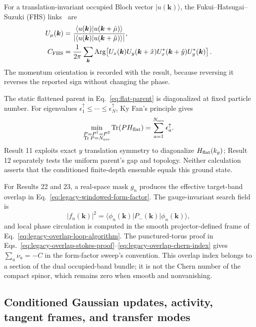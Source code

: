 \documentclass[aps,prb,twocolumn,floatfix,nofootinbib,superscriptaddress]{revtex4-2}
\newcommand{\Tr}{\operatorname{Tr}}
\begin{document}
For a translation-invariant occupied Bloch vector $|u(\boldsymbol k)\rangle$, the
Fukui--Hatsugai--Suzuki (FHS) links~\cite{FukuiHatsugaiSuzuki2005} are
\begin{align}
 U_\mu(\boldsymbol k)
 &=\frac{\langle u(\boldsymbol k)|u(\boldsymbol k+\hat\mu)\rangle}
 {|\langle u(\boldsymbol k)|u(\boldsymbol k+\hat\mu)\rangle|},\nonumber\\
 C_{\rm FHS}
 &=\frac{1}{2\pi}\sum_{\boldsymbol k}\operatorname{Arg}\!\left[
 U_x(\boldsymbol k)U_y(\boldsymbol k+\hat x)
 U_x^*(\boldsymbol k+\hat y)U_y^*(\boldsymbol k)\right].
 \label{eq:atlas-fhs}
\end{align}
The momentum orientation is recorded with the result, because reversing it reverses the
reported sign without changing the phase.

The static flattened parent in Eq.~\eqref{eq:flat-parent} is diagonalized at fixed
particle number.  For eigenvalues
$\epsilon_1^\uparrow\leq\cdots\leq\epsilon_N^\uparrow$, Ky Fan's principle gives
\begin{equation}
 \min_{\substack{P=P^\dagger=P^2\\\Tr P=N_{\rm occ}}}\Tr(PH_{\rm flat})
 =\sum_{a=1}^{N_{\rm occ}}\epsilon_a^\uparrow .
 \label{eq:atlas-ky-fan}
\end{equation}
Result 11 exploits exact $y$ translation symmetry to diagonalize
$H_{\rm flat}(k_y)$; Result 12 separately tests the uniform parent's gap and topology.
Neither calculation asserts that the conditioned finite-depth ensemble equals this
ground state.

For Results 22 and 23, a real-space mask $g_n$ produces the effective target-band overlap
in Eq.~\eqref{eq:legacy-windowed-form-factor}.  The gauge-invariant search field is
\begin{equation}
 |f_n(\boldsymbol k)|^2=
 \langle\phi_n(\boldsymbol k)|P_-(\boldsymbol k)|\phi_n(\boldsymbol k)\rangle ,
 \label{eq:atlas-overlap-magnitude}
\end{equation}
and local phase circulation is computed in the smooth projector-defined frame of
Eq.~\eqref{eq:legacy-overlap-loop-algorithm}.  The punctured-torus proof in
Eqs.~\eqref{eq:legacy-overlap-stokes-proof}--\eqref{eq:legacy-overlap-chern-index} gives
$\sum_a\nu_a=-C$ in the form-factor sweep's convention.  This overlap index belongs to a
section of the dual occupied-band bundle; it is not the Chern number of the compact
spinor, which remains zero when smooth and nonvanishing.

\subsection{Conditioned Gaussian updates, activity, tangent frames, and transfer modes}
\label{app:conditional-formalism}
\end{document}
